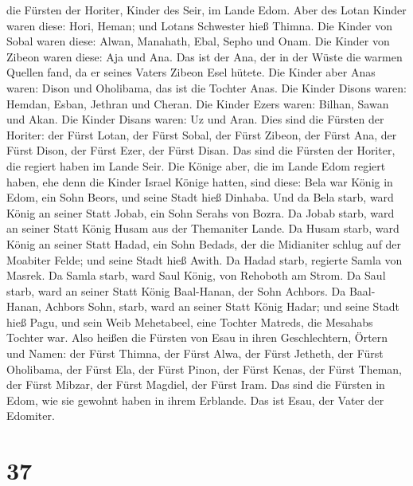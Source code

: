 die Fürsten der Horiter, Kinder des Seir, im Lande Edom. 
Aber des Lotan Kinder waren diese: Hori, Heman; und Lotans Schwester
hieß Thimna.  Die Kinder von Sobal waren diese: Alwan,
Manahath, Ebal, Sepho und Onam.  Die Kinder von Zibeon
waren diese: Aja und Ana. Das ist der Ana, der in der Wüste die warmen
Quellen fand, da er seines Vaters Zibeon Esel hütete.  Die
Kinder aber Anas waren: Dison und Oholibama, das ist die Tochter Anas.
 Die Kinder Disons waren: Hemdan, Esban, Jethran und
Cheran.  Die Kinder Ezers waren: Bilhan, Sawan und Akan.
 Die Kinder Disans waren: Uz und Aran.  Dies
sind die Fürsten der Horiter: der Fürst Lotan, der Fürst Sobal, der
Fürst Zibeon, der Fürst Ana,  der Fürst Dison, der Fürst
Ezer, der Fürst Disan. Das sind die Fürsten der Horiter, die regiert
haben im Lande Seir.  Die Könige aber, die im Lande Edom
regiert haben, ehe denn die Kinder Israel Könige hatten, sind diese:
 Bela war König in Edom, ein Sohn Beors, und seine Stadt
hieß Dinhaba.  Und da Bela starb, ward König an seiner
Statt Jobab, ein Sohn Serahs von Bozra.  Da Jobab starb,
ward an seiner Statt König Husam aus der Themaniter Lande. 
Da Husam starb, ward König an seiner Statt Hadad, ein Sohn Bedads, der
die Midianiter schlug auf der Moabiter Felde; und seine Stadt hieß
Awith.  Da Hadad starb, regierte Samla von Masrek.
 Da Samla starb, ward Saul König, von Rehoboth am Strom.
 Da Saul starb, ward an seiner Statt König Baal-Hanan, der
Sohn Achbors.  Da Baal-Hanan, Achbors Sohn, starb, ward an
seiner Statt König Hadar; und seine Stadt hieß Pagu, und sein Weib
Mehetabeel, eine Tochter Matreds, die Mesahabs Tochter war.
 Also heißen die Fürsten von Esau in ihren Geschlechtern,
Örtern und Namen: der Fürst Thimna, der Fürst Alwa, der Fürst Jetheth,
 der Fürst Oholibama, der Fürst Ela, der Fürst Pinon,
 der Fürst Kenas, der Fürst Theman, der Fürst Mibzar,
 der Fürst Magdiel, der Fürst Iram. Das sind die Fürsten in
Edom, wie sie gewohnt haben in ihrem Erblande. Das ist Esau, der Vater
der Edomiter.

\hypertarget{section-36}{%
\section{37}\label{section-36}}

